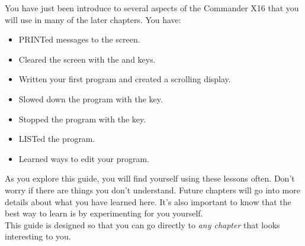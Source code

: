 \vspace{16pt}

You have just been introduce to several aspects of the Commander X16 that you
will use in many of the later chapters.  You have:

\begin{itemize}

	\item {\ttfamily PRINT}ed messages to the screen.

	\item Cleared the screen with the  and 
		keys.
	
	\item Written your first program and created a scrolling display.
	
	\item Slowed down the program with the  key.

	\item Stopped the program with the  key.

	\item {\ttfamily LIST}ed the program.

	\item Learned ways to edit your program.

\end{itemize}

\vspace{16pt}

As you explore this guide, you will find yourself using these lessons often.
Don't worry if there are things you don't understand.  Future chapters will go
into more details about what you have learned here.  It's also important to
know that the best way to learn is by experimenting for you yourself.\\

This guide is designed so that you can go directly to \emph{any chapter} that
looks interesting to you.


\@openrighttrue\makeatother
